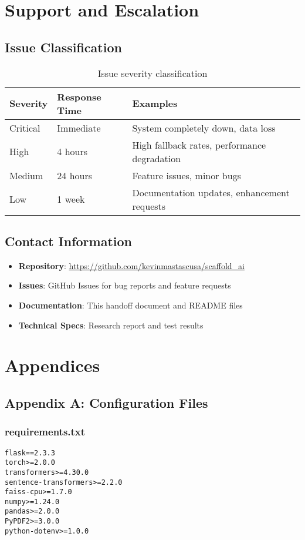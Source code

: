 \documentclass[12pt,a4paper]{article}
\begin{document}
\section{Support and Escalation}

\subsection{Issue Classification}
\begin{table}[H]
\centering
\begin{tabular}{@{}p{2cm}p{3cm}p{8cm}@{}}
\toprule
\textbf{Severity} & \textbf{Response Time} & \textbf{Examples} \\
\midrule
Critical & Immediate & System completely down, data loss \\
High & 4 hours & High fallback rates, performance degradation \\
Medium & 24 hours & Feature issues, minor bugs \\
Low & 1 week & Documentation updates, enhancement requests \\
\bottomrule
\end{tabular}
\caption{Issue severity classification}
\end{table}

\subsection{Contact Information}
\begin{itemize}
    \item \textbf{Repository}: \url{https://github.com/kevinmastascusa/scaffold_ai}
    \item \textbf{Issues}: GitHub Issues for bug reports and feature requests
    \item \textbf{Documentation}: This handoff document and README files
    \item \textbf{Technical Specs}: Research report and test results
\end{itemize}

\section{Appendices}

\subsection{Appendix A: Configuration Files}

\subsubsection{requirements.txt}
\begin{lstlisting}[language=text]
flask==2.3.3
torch>=2.0.0
transformers>=4.30.0
sentence-transformers>=2.2.0
faiss-cpu>=1.7.0
numpy>=1.24.0
pandas>=2.0.0
PyPDF2>=3.0.0
python-dotenv>=1.0.0
\end{lstlisting}
\end{document}
